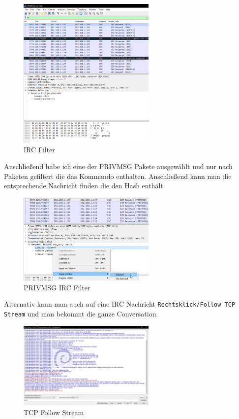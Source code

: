 \documentclass[12pt,a4paper,titlepage,oneside]{scrartcl}
\begin{document}
\begin{figure}[h!]
  \centering
    \includegraphics[width=0.6\textwidth]{./imgs/intranet_screenshots/ws_ircfilter.png}
  \caption{IRC Filter}
  \label{fig:ircfilter}
\end{figure}

Anschließend habe ich eine der PRIVMSG Pakete ausgewählt und nur nach Paketen gefiltert die das Kommando enthalten. Anschließend kann man die entsprechende Nachricht finden die den Hash enthält.

\begin{figure}[h!]
  \centering
    \includegraphics[width=0.6\textwidth]{./imgs/intranet_screenshots/ws_applyPrivMsgFilter.png}
  \caption{PRIVMSG IRC Filter}
  \label{fig:privmsgircfilter}
\end{figure}

Alternativ kann man auch auf eine IRC Nachricht \lstinline{Rechtsklick/Follow TCP Stream} und man bekommt die ganze Conversation.

\begin{figure}[h!]
  \centering
    \includegraphics[width=0.6\textwidth]{./imgs/intranet_screenshots/ircfollowstream.png}
  \caption{TCP Follow Stream}
  \label{fig:tcpFollowStream}
\end{figure}
\end{document}
